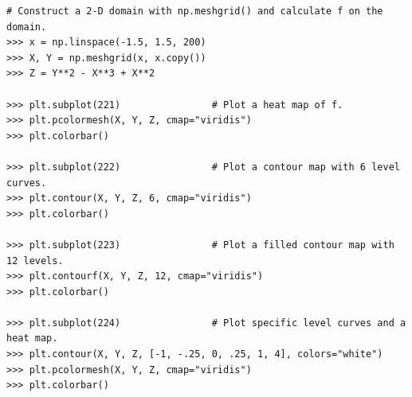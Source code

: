 \begin{lstlisting}
# Construct a 2-D domain with np.meshgrid() and calculate f on the domain.
>>> x = np.linspace(-1.5, 1.5, 200)
>>> X, Y = np.meshgrid(x, x.copy())
>>> Z = Y**2 - X**3 + X**2

>>> plt.subplot(221)                # Plot a heat map of f.
>>> plt.pcolormesh(X, Y, Z, cmap="viridis")
>>> plt.colorbar()

>>> plt.subplot(222)                # Plot a contour map with 6 level curves.
>>> plt.contour(X, Y, Z, 6, cmap="viridis")
>>> plt.colorbar()

>>> plt.subplot(223)                # Plot a filled contour map with 12 levels.
>>> plt.contourf(X, Y, Z, 12, cmap="viridis")
>>> plt.colorbar()

>>> plt.subplot(224)                # Plot specific level curves and a heat map.
>>> plt.contour(X, Y, Z, [-1, -.25, 0, .25, 1, 4], colors="white")
>>> plt.pcolormesh(X, Y, Z, cmap="viridis")
>>> plt.colorbar()
\end{lstlisting}

